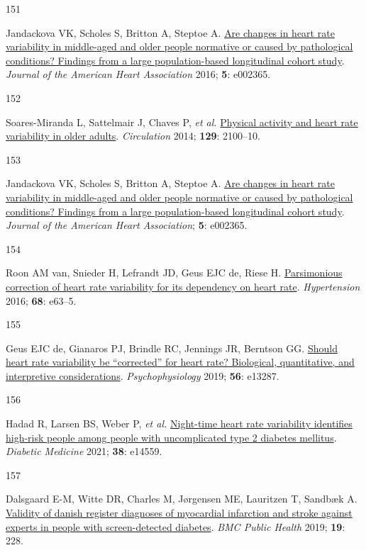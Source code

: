 \documentclass[
  letterpaper,
  headsepline=true,
  open=any]{scrbook}
\newlength{\cslhangindent}
\newlength{\csllabelwidth}
\newlength{\cslentryspacingunit} %
\newenvironment{CSLReferences}[2] %
 {%
  \setlength{\parindent}{0pt}
  \ifodd #1
  \let\oldpar\par
  \def\par{\hangindent=\cslhangindent\oldpar}
  \fi
  \setlength{\parskip}{#2\cslentryspacingunit}
 }%
 {}
\newcommand{\CSLLeftMargin}[1]{\parbox[t]{\csllabelwidth}{#1}}
\newcommand{\CSLRightInline}[1]{\parbox[t]{\linewidth - \csllabelwidth}{#1}\break}
\begin{document}
\begin{CSLReferences}{0}{0}
\leavevmode{}%
\CSLLeftMargin{151 }%
\CSLRightInline{Jandackova VK, Scholes S, Britton A, Steptoe A.
\href{https://doi.org/doi:10.1161/JAHA.115.002365}{Are changes in heart
rate variability in middle{-}aged and older people normative or caused
by pathological conditions? Findings from a large population{-}based
longitudinal cohort study}. \emph{Journal of the American Heart
Association} 2016; \textbf{5}: e002365.}

\leavevmode{}%
\CSLLeftMargin{152 }%
\CSLRightInline{Soares-Miranda L, Sattelmair J, Chaves P, \emph{et al.}
\href{https://doi.org/10.1161/CIRCULATIONAHA.113.005361}{Physical
activity and heart rate variability in older adults}. \emph{Circulation}
2014; \textbf{129}: 2100--10.}

\leavevmode{}%
\CSLLeftMargin{153 }%
\CSLRightInline{Jandackova VK, Scholes S, Britton A, Steptoe A.
\href{https://doi.org/10.1161/JAHA.115.002365}{Are changes in heart rate
variability in middle{-}aged and older people normative or caused by
pathological conditions? Findings from a large population{-}based
longitudinal cohort study}. \emph{Journal of the American Heart
Association}; \textbf{5}: e002365.}

\leavevmode{}%
\CSLLeftMargin{154 }%
\CSLRightInline{Roon AM van, Snieder H, Lefrandt JD, Geus EJC de, Riese
H. \href{https://doi.org/10.1161/HYPERTENSIONAHA.116.08053}{Parsimonious
correction of heart rate variability for its dependency on heart rate}.
\emph{Hypertension} 2016; \textbf{68}: e63--5.}

\leavevmode{}%
\CSLLeftMargin{155 }%
\CSLRightInline{Geus EJC de, Gianaros PJ, Brindle RC, Jennings JR,
Berntson GG. \href{https://doi.org/10.1111/psyp.13287}{Should heart rate
variability be {``}corrected{''} for heart rate? Biological,
quantitative, and interpretive considerations}. \emph{Psychophysiology}
2019; \textbf{56}: e13287.}

\leavevmode{}%
\CSLLeftMargin{156 }%
\CSLRightInline{Hadad R, Larsen BS, Weber P, \emph{et al.}
\href{https://doi.org/10.1111/dme.14559}{Night-time heart rate
variability identifies high-risk people among people with uncomplicated
type 2 diabetes mellitus}. \emph{Diabetic Medicine} 2021; \textbf{38}:
e14559.}

\leavevmode{}%
\CSLLeftMargin{157 }%
\CSLRightInline{Dalsgaard E-M, Witte DR, Charles M, Jørgensen ME,
Lauritzen T, Sandbæk A.
\href{https://doi.org/10.1186/s12889-019-6549-z}{Validity of danish
register diagnoses of myocardial infarction and stroke against experts
in people with screen-detected diabetes}. \emph{BMC Public Health} 2019;
\textbf{19}: 228.}


\end{CSLReferences}
\end{document}
